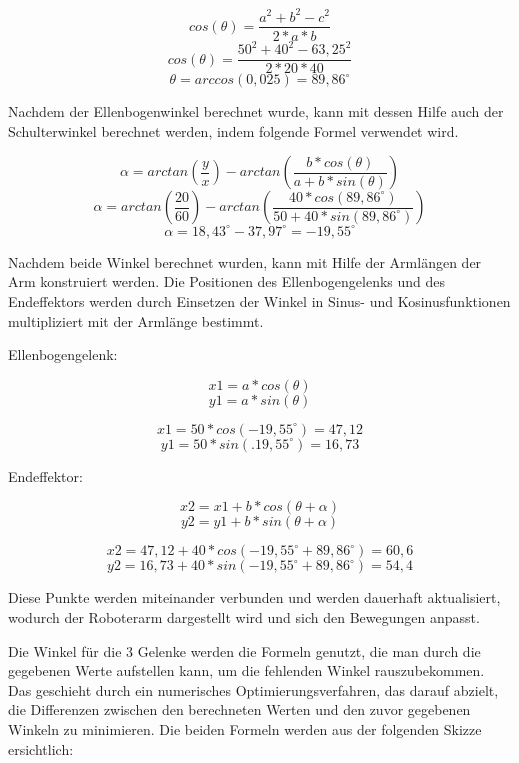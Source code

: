 \documentclass[12pt]{article}
\begin{document}
    \[
        cos(\theta)= \frac{a^2+b^2-c^2}{2*a*b}
    \]
    \[
        cos(\theta)= \frac{50^2+40^2-63,25^2}{2*20*40}
    \]
    \[
        \theta= arccos(0,025) = 89,86^\circ
    \]

    Nachdem der Ellenbogenwinkel berechnet wurde, kann mit dessen Hilfe auch der Schulterwinkel
    berechnet werden, indem folgende Formel verwendet wird.

    \[
        \alpha = arctan(\frac{y}{x}) - arctan(\frac{b*cos(\theta)}{a+b*sin(\theta)})
    \]
    \[
        \alpha = arctan(\frac{20}{60}) - arctan(\frac{40*cos(89,86^\circ)}{50+40*sin(89,86^\circ)})                    \]
    \[
        \alpha = 18,43^\circ - 37,97^\circ = -19,55^\circ
    \]

    

    Nachdem beide Winkel berechnet wurden, kann mit Hilfe der Armlängen der Arm konstruiert werden.
    Die Positionen des Ellenbogengelenks und des Endeffektors werden durch Einsetzen der Winkel in
    Sinus- und Kosinusfunktionen multipliziert mit der Armlänge bestimmt.

    Ellenbogengelenk:

    \[
        x1 = a * cos(\theta)
    \]
    \[
        y1 = a * sin(\theta)
    \]

    \[
        x1 = 50 * cos(-19,55^\circ) = 47,12
    \]
    \[
        y1 = 50 * sin(.19,55^\circ) = 16,73
    \]

    Endeffektor:

    \[
        x2 = x1 + b * cos(\theta + \alpha)
    \]
    \[
        y2 = y1 + b * sin(\theta + \alpha)
    \]

    \[
        x2 = 47,12 + 40 * cos(-19,55^\circ + 89,86^\circ) = 60,6
    \]
    \[
        y2 = 16,73 + 40 * sin(-19,55^\circ + 89,86^\circ) = 54,4
    \]

    Diese Punkte werden miteinander verbunden und werden dauerhaft aktualisiert, wodurch der
    Roboterarm dargestellt wird und sich den Bewegungen anpasst.

    

    Die Winkel für die 3 Gelenke werden die Formeln genutzt, die man durch die gegebenen Werte aufstellen kann,
    um die fehlenden Winkel rauszubekommen. Das geschieht durch ein numerisches Optimierungsverfahren, das darauf
    abzielt, die Differenzen zwischen den berechneten Werten und den zuvor gegebenen Winkeln zu minimieren.
    Die beiden Formeln werden aus der folgenden Skizze ersichtlich:
\end{document}
